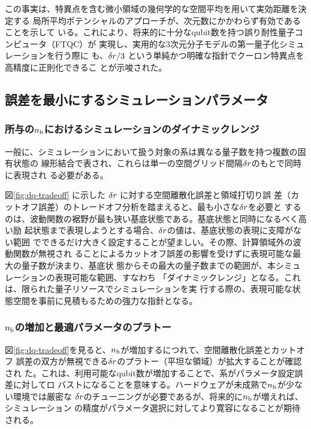 \documentclass[wabun2025.tex]{subfiles}
\begin{document}
この事実は、特異点を含む微小領域の幾何学的な空間平均を用いて実効距離を決定する
局所平均ポテンシャルのアプローチが、次元数にかかわらず有効であることを示して
いる。これにより、将来的に十分なqubit数を持つ誤り耐性量子コンピュータ（FTQC）が
実現し、実用的な3次元分子モデルの第一量子化シミュレーションを行う際に
も、$\delta r/3$ という単純かつ明確な指針でクーロン特異点を高精度に正則化できるこ
とが示唆された。

\subsection{誤差を最小にするシミュレーションパラメータ}
\label{sec:parameter-selection-for-minimum-error-analysis}
\subsubsection{所与の$n_{\mathrm{b}}$におけるシミュレーションのダイナミックレンジ}
一般に、シミュレーションにおいて扱う対象の系は異なる量子数を持つ複数の固有状態の
線形結合で表され、これらは単一の空間グリッド間隔$\delta r$のもとで同時に表現され
る必要がある。

図\ref{fig:dq-tradeoff} に示した $\delta r$ に対する空間離散化誤差と領域打切り誤
差（カットオフ誤差）のトレードオフ分析を踏まえると、最も小さな$\delta r$を必要と
するのは、波動関数の裾野が最も狭い基底状態である。基底状態と同時になるべく高い励
起状態まで表現しようとする場合、$\delta r$の値は、基底状態の表現に支障がない範囲
でできるだけ大きく設定することが望ましい。その際、計算領域外の波動関数が無視され
ることによるカットオフ誤差の影響を受けずに表現可能な最大の量子数が決まり、基底状
態からその最大の量子数までの範囲が、本シミュレーションの表現可能な範囲、すなわち
「ダイナミックレンジ」となる。これは、限られた量子リソースでシミュレーションを実
行する際の、表現可能な状態空間を事前に見積もるための強力な指針となる。

\subsubsection{$n_{\mathrm{b}}$の増加と最適パラメータのプラトー}
図\ref{fig:dq-tradeoff}を見ると、$n_{\mathrm{b}}$が増加するにつれて、空間離散化誤差とカットオフ
誤差の双方が無視できる$\delta r$のプラトー（平坦な領域）が拡大することが確認され
た。これは、利用可能なqubit数が増加することで、系がパラメータ設定誤差に対してロ
バストになることを意味する。ハードウェアが未成熟で$n_{\mathrm{b}}$が少ない環境では厳密な
$\delta r$のチューニングが必要であるが、将来的に$n_{\mathrm{b}}$が増えれば、シミュレーション
の精度がパラメータ選択に対してより寛容になることが期待される。
\end{document}
